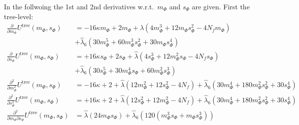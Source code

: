 In the follwoing the 1st and 2nd derivatives w.r.t.\ $m_{\Phi}$ and $s_{\Phi}$ are given. First the tree-level:
\begin{align}\label{CEP_derivative_dm_treeLevel}
 \frac{\partial}{\partial m_{\Phi}}  U^{\text{tree}}(m_{\Phi}, s_{\Phi})&=
                    -16 \kappa m_{\Phi} + 2 m_{\Phi} + \hat\lambda \left( 4 m_{\Phi}^3 + 12 m_{\Phi} s_{\Phi}^2 -4 N_f  m_{\Phi} \right)
                    \nonumber \\
                    & + \hat\lambda_6\left( 30 m_{\Phi}^5 + 60 m_{\Phi}^3 s_{\Phi}^2 + 30 m_{\Phi} s_{\Phi}^4 \right)
                    \\ \label{eq:CEP_derivative_ds_treeLevel}
 \frac{\partial}{\partial s_{\Phi}}  U^{\text{tree}}(m_{\Phi}, s_{\Phi})&=
                    +16 \kappa s_{\Phi} + 2 s_{\Phi} + \hat\lambda \left( 4 s_{\Phi}^3 + 12 m_{\Phi}^2 s_{\Phi} -4 N_f  s_{\Phi} \right)
                    \nonumber \\
                    & + \hat\lambda_6\left( 30 s_{\Phi}^5 + 30 m_{\Phi}^4 s_{\Phi} + 60 m_{\Phi}^2 s_{\Phi}^3 \right)
                    \\ \label{eq:CEP_derivative_dmdm_treeLevel}
 \frac{\partial^2}{\partial m_{\Phi}^2}  U^{\text{tree}}(m_{\Phi}, s_{\Phi})&=
                    -16 \kappa  + 2 + \hat\lambda \left( 12 m_{\Phi}^2 + 12 s_{\Phi}^2 - 4 N_f \right)
                    + \hat\lambda_6 \left( 30m_{\Phi}^4 + 180 m_{\Phi}^2 s_{\Phi}^2 + 30 s_{\Phi}^4 \right)
                    \\ \label{eq:CEP_derivative_dsds_treeLevel}
 \frac{\partial^2}{\partial s_{\Phi}^2}  U^{\text{tree}}(m_{\Phi}, s_{\Phi})&=
                    +16 \kappa  + 2 + \hat\lambda \left( 12 s_{\Phi}^2 + 12 m_{\Phi}^2 - 4 N_f \right)
                    + \hat\lambda_6 \left( 30m_{\Phi}^4 + 180 m_{\Phi}^2 s_{\Phi}^2 + 30 s_{\Phi}^4 \right)
 \\ \label{eq:CEP_derivative_dmds_treeLevel}
 \frac{\partial^2}{\partial m_{\Phi} \partial s_{\Phi}}  U^{\text{tree}}(m_{\Phi}, s_{\Phi})&=
                    \hat\lambda \left( 24 m_{\Phi} s_{\Phi} \right) 
                    + \hat\lambda_6 \left( 120 \left( m_{\Phi}^3 s_{\Phi} + m_{\Phi} s_{\Phi}^3 \right) \right)
\end{align}


